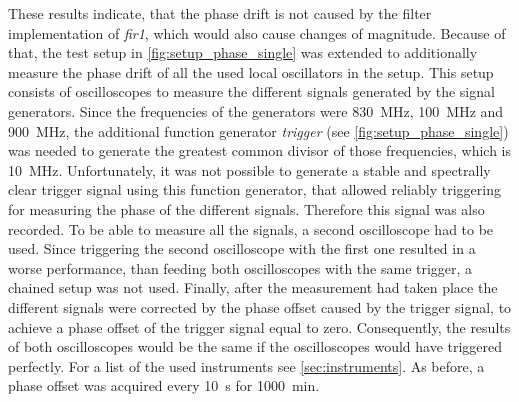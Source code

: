 \documentclass[12pt,a4paper,parskip=full,abstract=true,BCOR=12mm,twoside,open=right]{scrreprt}
\def\device#1{\textit{#1}}
\begin{document}
These results indicate, that the phase drift is not caused by the filter implementation of
\device{fir1}, which would also cause changes of magnitude. Because of that, the test %
setup in \cref{fig:setup_phase_single} was extended to additionally measure the phase drift of all the
used local oscillators in the setup. This setup consists of oscilloscopes to measure
the different signals generated by the signal generators. Since the frequencies
of the generators were \SI{830}{\mega\hertz}, \SI{100}{\mega\hertz} and \SI{900}{\mega\hertz},
the additional function generator \device{trigger} (see \cref{fig:setup_phase_single}) was needed to
generate the greatest common divisor of those frequencies, which is \SI{10}{\mega\hertz}.
Unfortunately, it was not possible to generate a stable and spectrally clear trigger signal using this function generator, that
allowed reliably triggering for measuring the phase of the different signals. Therefore this signal was also recorded.
To be able to measure all the signals, a second oscilloscope had to be used. Since triggering
the second oscilloscope with the first one resulted in a worse performance, than feeding both
oscilloscopes with the same trigger, a chained setup was not used. Finally, after the measurement had taken place the
different signals were corrected by the phase offset caused by the trigger signal, to achieve a phase
offset of the trigger signal equal to zero. Consequently, the results of both oscilloscopes would be the same if the oscilloscopes would
have triggered perfectly. For a list of the used instruments see \cref{sec:instruments}. As before, a phase offset was acquired every \SI{10}{\second}
for \SI{1000}{\minute}.
\end{document}
